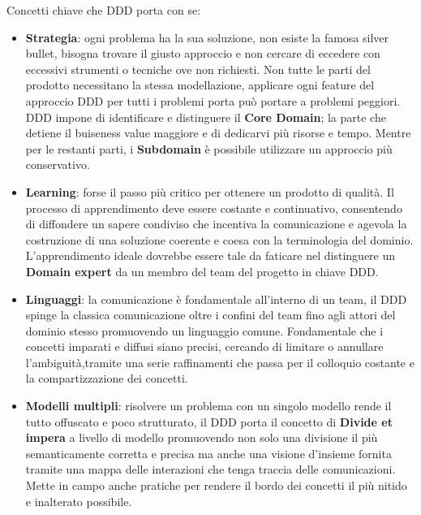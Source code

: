    
    
    Concetti chiave che DDD porta con se:
    
        \begin{itemize}
        \item \textbf{Strategia}: ogni problema ha la sua soluzione, non esiste la famosa silver bullet, bisogna trovare il giusto approccio e non cercare di eccedere con eccessivi strumenti o tecniche ove non richiesti.
        Non tutte le parti del prodotto necessitano la stessa modellazione, applicare ogni feature del approccio DDD per tutti i problemi porta può portare a problemi peggiori.
        DDD impone di identificare e distinguere il \textbf{Core Domain}; la parte che detiene il buiseness value maggiore e di dedicarvi più risorse e tempo.
        Mentre per le restanti parti, i \textbf{Subdomain} è possibile utilizzare un approccio più conservativo.
        
        \item \textbf{Learning}: forse il passo più critico per ottenere un prodotto di qualità. Il processo di apprendimento deve essere costante e continuativo, consentendo di diffondere un sapere condiviso che incentiva la comunicazione e agevola la costruzione di una soluzione coerente e coesa con la terminologia del dominio. 
        L'apprendimento ideale dovrebbe essere tale da faticare nel distinguere un \textbf{Domain expert} da un membro del team del progetto in chiave DDD.
        
        \item \textbf{Linguaggi}: la comunicazione è fondamentale all'interno di un team, il DDD spinge la classica comunicazione oltre i confini del team fino agli attori del dominio stesso promuovendo un linguaggio comune.
        Fondamentale che i concetti imparati e diffusi siano precisi, cercando di limitare o annullare l'ambiguità,tramite una serie raffinamenti che passa per il colloquio costante e la compartizzazione dei concetti.
        
        \item \textbf{Modelli multipli}: risolvere un problema con un singolo modello rende il tutto offuscato e poco strutturato, il DDD porta il concetto di \textbf{Divide et impera} a livello di modello promuovendo non solo una divisione il più semanticamente corretta e precisa ma anche una visione d'insieme fornita tramite una mappa delle interazioni che tenga traccia delle comunicazioni.
        Mette in campo anche pratiche per rendere il bordo dei concetti il più nitido e inalterato possibile.
        

\end{itemize}
